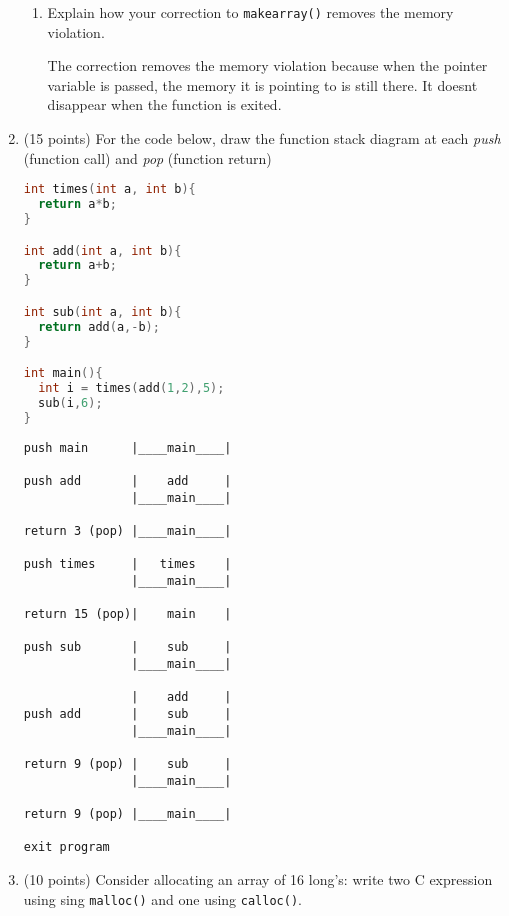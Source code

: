 \documentclass{article}[9pt]
\newenvironment{answerfont}{\fontfamily{qhv}\selectfont}{\par}
\newenvironment{myanswer}{\begin{mdframed}\begin{answerfont}}{\end{answerfont}\end{mdframed}}
\begin{document}
\begin{enumerate}
\begin{enumerate}
\item Explain how your correction to \texttt{makearray()} removes the memory violation.

\begin{myanswer}
The correction removes the memory violation because when the pointer variable is passed, the memory it is pointing to
is still there. It doesnt disappear when the function is exited.
\end{myanswer}


\end{enumerate}

\item (15 points) For the code below, draw the function stack diagram at each
\emph{push} (function call) and \emph{pop} (function return)

\begin{lstlisting}[language=c]
int times(int a, int b){
  return a*b;
}

int add(int a, int b){
  return a+b;
}

int sub(int a, int b){
  return add(a,-b);
}

int main(){
  int i = times(add(1,2),5);
  sub(i,6);
}
\end{lstlisting}

\begin{myanswer}
\begin{lstlisting}
push main      |____main____|

push add       |    add     |
               |____main____|

return 3 (pop) |____main____|

push times     |   times    |
               |____main____|

return 15 (pop)|    main    |

push sub       |    sub     |
               |____main____|

               |    add     |
push add       |    sub     |
               |____main____|

return 9 (pop) |    sub     |
               |____main____|

return 9 (pop) |____main____|

exit program
\end{lstlisting}
\end{myanswer}


\item (10 points) Consider allocating an array of 16 long's: write two C expression using sing \texttt{malloc()} and one using \texttt{calloc()}.


\end{enumerate}
\end{document}

